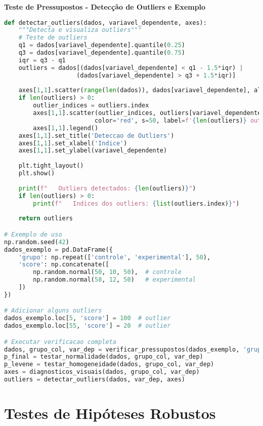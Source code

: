 \begin{examplebox}
\textbf{Teste de Pressupostos - Detecção de Outliers e Exemplo}

\begin{lstlisting}[language=Python]
def detectar_outliers(dados, variavel_dependente, axes):
    """Detecta e visualiza outliers"""
    # Teste de outliers
    q1 = dados[variavel_dependente].quantile(0.25)
    q3 = dados[variavel_dependente].quantile(0.75)
    iqr = q3 - q1
    outliers = dados[(dados[variavel_dependente] < q1 - 1.5*iqr) | 
                    (dados[variavel_dependente] > q3 + 1.5*iqr)]
    
    axes[1,1].scatter(range(len(dados)), dados[variavel_dependente], alpha=0.6)
    if len(outliers) > 0:
        outlier_indices = outliers.index
        axes[1,1].scatter(outlier_indices, outliers[variavel_dependente], 
                         color='red', s=50, label=f'{len(outliers)} outliers')
        axes[1,1].legend()
    axes[1,1].set_title('Deteccao de Outliers')
    axes[1,1].set_xlabel('Indice')
    axes[1,1].set_ylabel(variavel_dependente)
    
    plt.tight_layout()
    plt.show()
    
    print(f"   Outliers detectados: {len(outliers)}")
    if len(outliers) > 0:
        print(f"   Indices dos outliers: {list(outliers.index)}")
    
    return outliers

# Exemplo de uso
np.random.seed(42)
dados_exemplo = pd.DataFrame({
    'grupo': np.repeat(['controle', 'experimental'], 50),
    'score': np.concatenate([
        np.random.normal(50, 10, 50),  # controle
        np.random.normal(58, 12, 50)   # experimental
    ])
})

# Adicionar alguns outliers
dados_exemplo.loc[5, 'score'] = 100  # outlier
dados_exemplo.loc[55, 'score'] = 20  # outlier

# Executar verificacao completa
dados, grupo_col, var_dep = verificar_pressupostos(dados_exemplo, 'grupo', 'score')
p_final = testar_normalidade(dados, grupo_col, var_dep)
p_levene = testar_homogeneidade(dados, grupo_col, var_dep)
axes = diagnosticos_visuais(dados, grupo_col, var_dep)
outliers = detectar_outliers(dados, var_dep, axes)
\end{lstlisting}
\end{examplebox}

\section{Testes de Hipóteses Robustos}

